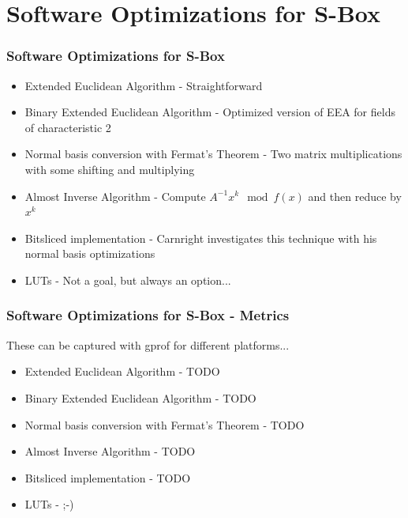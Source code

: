 \documentclass[handout]{beamer}
\begin{document}
\section{Software Optimizations for S-Box}
\begin{frame}
	\frametitle{Software Optimizations for S-Box}
	\begin{itemize}
		\item Extended Euclidean Algorithm - Straightforward
		\item Binary Extended Euclidean Algorithm - Optimized version of EEA for fields of characteristic 2
		\item Normal basis conversion with Fermat's Theorem - Two matrix multiplications with some shifting and multiplying
		\item Almost Inverse Algorithm - Compute $A^{-1}x^k \mod f(x)$ and then reduce by $x^k$
		\item Bitsliced implementation - Carnright investigates this technique with his normal basis optimizations
		\item LUTs - Not a goal, but always an option...
	\end{itemize}
\end{frame}

\begin{frame}
	\frametitle{Software Optimizations for S-Box - Metrics}
	These can be captured with gprof for different platforms...
	\begin{itemize}
		\item Extended Euclidean Algorithm - TODO		
		\item Binary Extended Euclidean Algorithm - TODO
		\item Normal basis conversion with Fermat's Theorem - TODO
		\item Almost Inverse Algorithm - TODO
		\item Bitsliced implementation - TODO
		\item LUTs - ;-)
	\end{itemize}
\end{frame}
\end{document}
